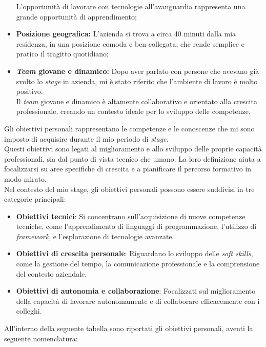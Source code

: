 \begin{itemize}
    L'opportunità di lavorare con tecnologie all'avanguardia rappresenta una grande opportunità di apprendimento;
    \item \textbf{Posizione geografica:} L'azienda si trova a circa 40 minuti dalla mia residenza, in una posizione comoda e ben collegata, che rende semplice e pratico il tragitto quotidiano;
    \item \textbf{\textit{Team} giovane e dinamico:} Dopo aver parlato con persone che avevano già svolto lo \textit{stage} in azienda, mi è stato riferito che l'ambiente di lavoro è molto positivo.\\
    Il \textit{team} giovane e dinamico è altamente collaborativo e orientato alla crescita professionale, creando un contesto ideale per lo sviluppo delle competenze.
\end{itemize}


\noindent Gli obiettivi personali rappresentano le competenze e le conoscenze che mi sono imposto di acquisire durante il mio periodo di \textit{stage}.\\

\noindent Questi obiettivi sono legati al miglioramento e allo sviluppo delle proprie capacità professionali, sia dal punto di vista tecnico che umano.
La loro definizione aiuta a focalizzarsi su aree specifiche di crescita e a pianificare il percorso formativo in modo mirato. \\

\noindent Nel contesto del mio stage, gli obiettivi personali possono essere suddivisi in tre categorie principali:

\begin{itemize}
    \item \textbf{Obiettivi tecnici}: Si concentrano sull'acquisizione di nuove competenze tecniche, come l'apprendimento di linguaggi di programmazione, l'utilizzo di \textit{framework}, e l'esplorazione di tecnologie avanzate.
    \item \textbf{Obiettivi di crescita personale}: Riguardano lo sviluppo delle \textit{soft skills}, come la gestione del tempo, la comunicazione professionale e la comprensione del contesto aziendale.
    \item \textbf{Obiettivi di autonomia e collaborazione}: Focalizzati sul miglioramento della capacità di lavorare autonomamente e di collaborare efficacemente con i colleghi.
\end{itemize}

\noindent All'interno della seguente tabella sono riportati gli obiettivi personali, aventi la seguente nomenclatura:

